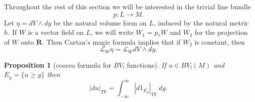 \documentclass[reqno,12pt,letterpaper]{amsart}
\newcommand{\RR}{\mathbf{R}}
\newtheorem{proposition}[theorem]{Proposition}
\theoremstyle{definition}
\numberwithin{equation}{section}
\begin{document}
Throughout the rest of this section we will be interested in the trivial line bundle
$$p: L \to M.$$
Let $\eta = dV \wedge dy$ be the natural volume form on $L$, induced by the natural metric $h$.
If $W$ is a vector field on $L$, we will write $W_1 = p_* W$ and $W_2$ for the projection of $W$ onto $\RR$.
Then Cartan's magic formula implies that if $W_2$ is constant, then
\begin{equation}
\label{Lie derivative computation}
\mathcal L_W\eta = \mathcal L_WdV \wedge dy.
\end{equation}

\begin{proposition}[coarea formula for $BV_l$ functions]\label{Coarea2}
If $u \in BV_l(M)$ and $E_y = \{u \geq y\}$ then
$$|du|_{TV} = \int_{-\infty}^\infty |d1_{E_y}|_{TV} ~dy.$$
\end{proposition}
\end{document}
